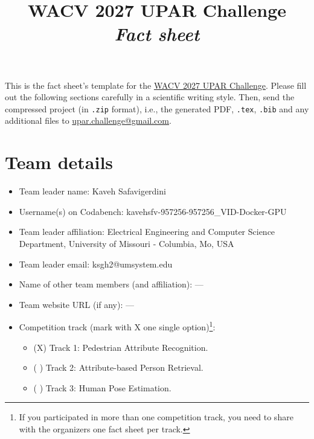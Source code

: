 \documentclass[a4paper, 10pt, conference]{ieeeconf}
\title{WACV 2027 UPAR Challenge\\ \textit{Fact sheet}}
\begin{document}
\maketitle
This is the fact sheet's template for the \href{https://vap.aau.dk/rws/challenge/}{WACV 2027 UPAR Challenge}. Please fill out the following sections carefully in a scientific writing style. Then, send the compressed project (in \texttt{.zip} format), i.e., the generated PDF, \texttt{.tex}, \texttt{.bib} and any additional files to \url{upar.challenge@gmail.com}.
%
%


\section{Team details}\label{teamdetails}
\begin{itemize}
    \item Team leader name: Kaveh Safavigerdini
    \item Username(s) on Codabench: kavehsfv-957256-957256\_VID-Docker-GPU
    \item Team leader affiliation: Electrical Engineering and Computer Science Department, University of Missouri - Columbia, Mo, USA
    \item Team leader email: ksgh2@umsystem.edu
    \item Name of other team members (and affiliation): ---
    \item Team website URL (if any): ---
    \item Competition track (mark with X one single option)\footnote{If you participated in more than one competition track, you need to share with the organizers one fact sheet per track.}:
    \begin{itemize}
        \item (X) Track 1: Pedestrian Attribute Recognition.
        \item ( ) Track 2: Attribute-based Person Retrieval.
        \item ( ) Track 3: Human Pose Estimation.
    \end{itemize}
\end{itemize}
%
%
\end{document}
